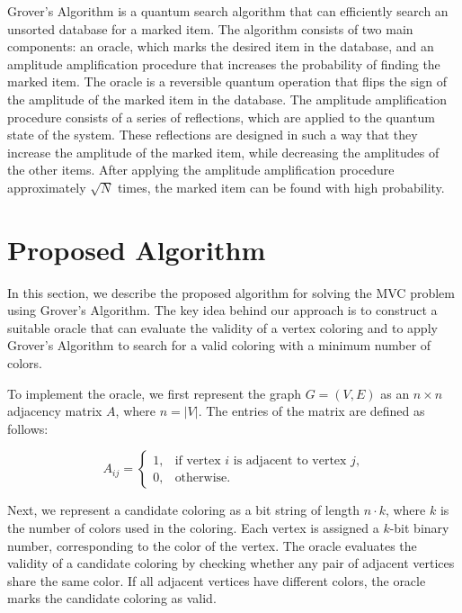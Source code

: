 Grover's Algorithm is a quantum search algorithm that can efficiently search an unsorted database for a marked item. The algorithm consists of two main components: an oracle, which marks the desired item in the database, and an amplitude amplification procedure that increases the probability of finding the marked item. The oracle is a reversible quantum operation that flips the sign of the amplitude of the marked item in the database. The amplitude amplification procedure consists of a series of reflections, which are applied to the quantum state of the system. These reflections are designed in such a way that they increase the amplitude of the marked item, while decreasing the amplitudes of the other items. After applying the amplitude amplification procedure approximately $\sqrt{N}$ times, the marked item can be found with high probability.

\section{Proposed Algorithm}
\label{sec:algorithm}

In this section, we describe the proposed algorithm for solving the MVC problem using Grover's Algorithm. The key idea behind our approach is to construct a suitable oracle that can evaluate the validity of a vertex coloring and to apply Grover's Algorithm to search for a valid coloring with a minimum number of colors.

To implement the oracle, we first represent the graph $G = (V, E)$ as an $n \times n$ adjacency matrix $A$, where $n = |V|$. The entries of the matrix are defined as follows:

\begin{equation}
A_{ij} =
\begin{cases}
1, & \text{if vertex $i$ is adjacent to vertex $j$,} \\
0, & \text{otherwise.}
\end{cases}
\end{equation}

Next, we represent a candidate coloring as a bit string of length $n \cdot k$, where $k$ is the number of colors used in the coloring. Each vertex is assigned a $k$-bit binary number, corresponding to the color of the vertex. The oracle evaluates the validity of a candidate coloring by checking whether any pair of adjacent vertices share the same color. If all adjacent vertices have different colors, the oracle marks the candidate coloring as valid.

